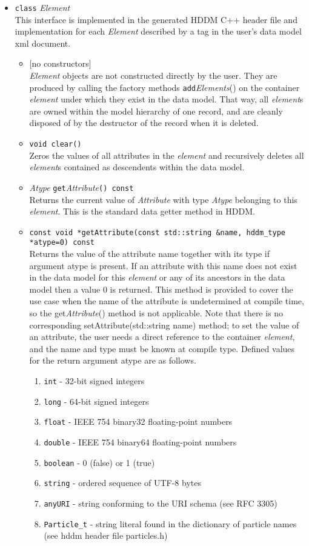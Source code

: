 \documentclass{revtex4}
\begin{document}
\begin{itemize}
\item \texttt{class} {\em Element}\\
This interface is implemented in the generated HDDM C++ header file and
implementation for each {\em Element} described by a tag in the user's
data model xml document.
\begin{itemize}
\item {}[no constructors]\\
{\em Element} objects are not constructed directly by the user. They are
produced by calling the factory methods \texttt{add}{\em Elements}() on
the container {\em element} under which they exist in the data model.
That way, all {\em element}s are owned within the model hierarchy of one
record, and are cleanly disposed of by the destructor of the record when it
is deleted.
\item \texttt{void clear()}\\
Zeros the values of all attributes in the {\em element} and recursively
deletes all {\em element}s contained as descendents within the data model.
\item {\em Atype} \texttt{get}{\em Attribute}\texttt{() const}\\
Returns the current value of {\em Attribute} with type {\em Atype}
belonging to this {\em element}. This is the standard data getter method
in HDDM.
\item \texttt{const void *getAttribute(const std::string \&name, hddm\_type *atype=0) const}\\
Returns the value of the attribute name together with its type if argument
atype is present. If an attribute with this name does not exist in the data
model for this {\em element} or any of its ancestors in the data model then a 
value 0 is returned. This method is provided to cover the use case when the
name of the attribute is undetermined at compile time, so the 
get{\em Attribute}() method is not applicable. Note that there is no corresponding
setAttribute(std::string name) method; to set the value of an attribute, the
user needs a direct reference to the container {\em element}, and the name
and type must be known at compile type. Defined values for the return argument
atype are as follows.
\begin{enumerate}
\item \texttt{int} - 32-bit signed integers
\item \texttt{long} - 64-bit signed integers
\item \texttt{float} - IEEE 754 binary32 floating-point numbers
\item \texttt{double} - IEEE 754 binary64 floating-point numbers
\item \texttt{boolean} - 0 (false) or 1 (true)
\item \texttt{string} - ordered sequence of UTF-8 bytes
\item \texttt{anyURI} - string conforming to the URI schema (see RFC 3305)
\item \texttt{Particle\_t} - string literal found in the dictionary of particle
names (see hddm header file particles.h)
\end{enumerate}


\end{itemize}
\end{itemize}
\end{document}
